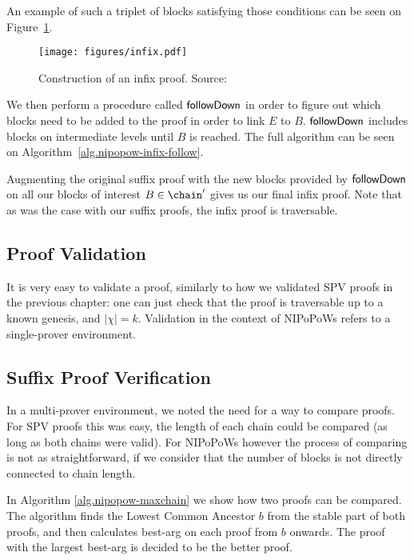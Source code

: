 An example of such a triplet of blocks satisfying those conditions can be seen on Figure~\ref{fig:infix-proof}.

\begin{figure}
  \centering
  \texttt{[image: figures/infix.pdf]}
  \caption{Construction of an infix proof.  Source:~\cite{nipopows}}
  \label{fig:infix-proof}
\end{figure}

We then perform a procedure called $\sf followDown$ in order to figure out which blocks need to be added to the proof in order to link $E$ to $B$. $\sf followDown$ includes blocks on intermediate levels until $B$ is reached. The full algorithm can be seen on Algorithm~\ref{alg.nipopow-infix-follow}.



Augmenting the original suffix proof with the new blocks provided by $\sf followDown$ on all our blocks of interest $B \in \chain'$ gives us our final infix proof. Note that as was the case with our suffix proofs, the infix proof is traversable.


\subsection{Proof Validation}
It is very easy to validate a proof, similarly to how we validated SPV proofs in the previous chapter: one can just check that the proof is traversable up to a known genesis, and $|\chi| = k$. Validation in the context of NIPoPoWs refers to a single-prover environment.

\subsection{Suffix Proof Verification}
In a multi-prover environment, we noted the need for a way to compare proofs. For SPV proofs this was easy, the length of each chain could be compared (as long as both chains were valid). For NIPoPoWs however the process of comparing is not as straightforward, if we consider that the number of blocks is not directly connected to chain length.

In Algorithm \ref{alg.nipopow-maxchain} we show how two proofs can be compared. The algorithm finds the Lowest Common Ancestor $b$ from the stable part of both proofs, and then calculates \textsf{best-arg} on each proof from $b$ onwards. The proof with the largest \textsf{best-arg} is decided to be the better proof.

